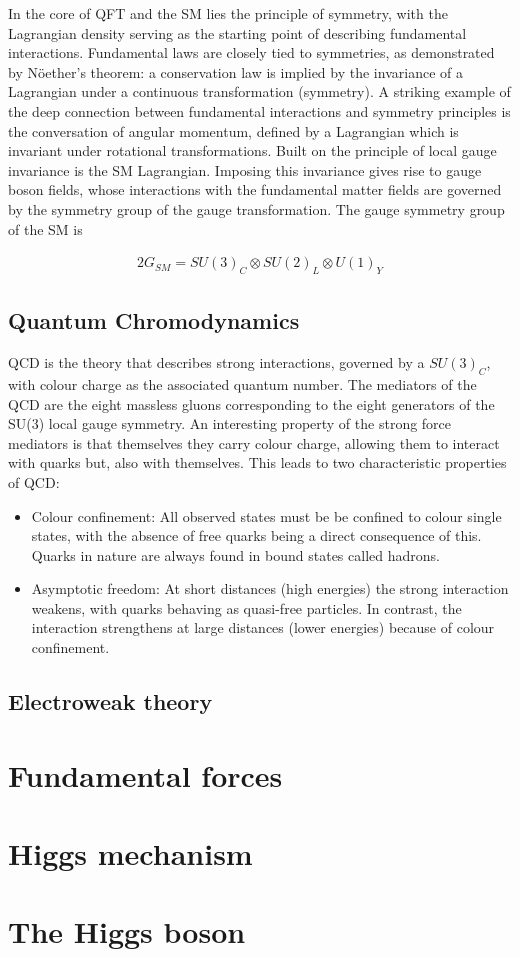 In the core of QFT and the SM lies the principle of symmetry, with the Lagrangian density serving as the starting point of describing fundamental interactions. Fundamental laws are closely tied to symmetries, as demonstrated by N\"{o}ether's theorem: a conservation law is implied by the invariance of a Lagrangian under a continuous transformation (symmetry). A striking example of the deep connection between fundamental interactions and symmetry principles is the conversation of angular momentum, defined by a Lagrangian which is invariant under rotational transformations. Built on the principle of local gauge invariance is the SM Lagrangian. Imposing this invariance gives rise to gauge boson fields, whose interactions with the fundamental matter fields are governed by the symmetry group of the gauge transformation. The gauge symmetry group of the SM is

\begin{alignat}{2}
G_{SM} = SU(3)_{C} \otimes SU(2)_{L} \otimes U(1)_{Y}
\end{alignat}

\subsection*{Quantum Chromodynamics}

\ac{QCD} is the theory that describes strong interactions, governed by a $SU(3)_{C}$, with colour charge as the associated quantum number. The mediators of the QCD are the eight massless gluons corresponding to the eight generators of the SU(3) local gauge symmetry. An interesting property of the strong force mediators is that themselves they carry colour charge, allowing them to interact with quarks but, also with themselves. This leads to two characteristic properties of QCD:

\begin{itemize}
    \item Colour confinement: All observed states must be be confined to colour single states, with the absence of free quarks being a direct consequence of this. Quarks in nature are always found in bound states called hadrons.
    \item Asymptotic freedom: At short distances (high energies) the strong interaction weakens, with quarks behaving as quasi-free particles. In contrast, the interaction strengthens at large distances (lower energies) because of colour confinement. 

\end{itemize}

\subsection*{Electroweak theory}

\section{Fundamental forces}
\section{Higgs mechanism}
\section{The Higgs boson}

\cite{Rowling_1997}
\cite{Thor_2011}